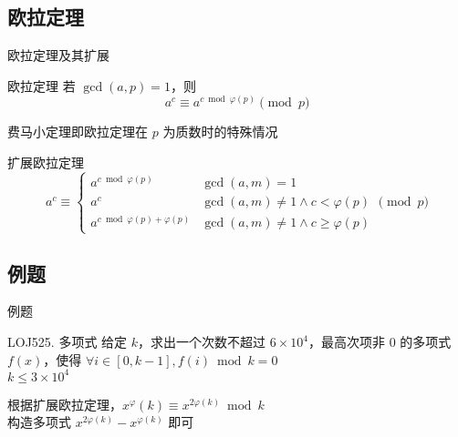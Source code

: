 \documentclass[UTF8]{beamer}
\begin{document}
    \subsection{欧拉定理}
    \begin{frame}{欧拉定理及其扩展}
        \begin{block}{欧拉定理}
            若 $\gcd(a,p)=1$，则
            $$
            a^c\equiv a^{c\bmod \varphi(p)}\pmod p
            $$
        \end{block}
        费马小定理即欧拉定理在 $p$ 为质数时的特殊情况\\
        \pause
        \begin{block}{扩展欧拉定理}
            $$
            a^c\equiv\begin{cases}a^{c\bmod \varphi(p)} &\gcd(a,m)=1\\
            a^c &\gcd(a,m)\neq 1 \land c< \varphi(p)\\
            a^{c\bmod \varphi(p)+\varphi(p)} &\gcd(a,m)\neq 1 \land c\ge \varphi(p)
            \end{cases}
            \pmod p
            $$
        \end{block}
    \end{frame}

    \subsection{例题}
    \begin{frame}{例题}
        \begin{block}{LOJ525. 多项式}
            给定 $k$，求出一个次数不超过 $6\times 10^4$，最高次项非 $0$ 的多项式 $f(x)$，使得 $\forall i\in[0,k-1],f(i)\bmod k=0$\\
            $k\le 3\times 10^4$
        \end{block}
        \pause
        根据扩展欧拉定理，$x^\varphi(k)\equiv x^{2\varphi(k)} \bmod k$\\
        构造多项式 $x^{2\varphi(k)}-x^{\varphi(k)}$ 即可
    \end{frame}
\end{document}
